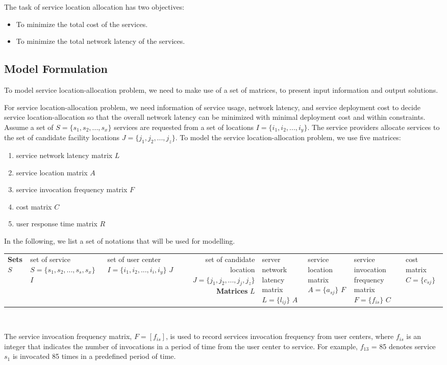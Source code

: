 \documentclass{llncs}
\begin{document}
The task of service location allocation has two objectives:
\begin{itemize}
	\item To minimize the total cost of the services.
	\item To minimize the total network latency of the services.
\end{itemize}


\subsection{Model Formulation}
To model service location-allocation problem, we need to make use of a set of matrices, to present input information and output solutions. 

For service location-allocation problem, we need information of service usage, network latency, and service deployment cost to decide service location-allocation so that the overall network latency can be minimized with minimal deployment cost and within constraints.
Assume a set of $S = \{ s_{1}, s_{2}, ..., s_{x}\}$ services are
requested from a set of locations $I = \{ i_{1}, i_{2}, ..., i_{y} \}$. 
The service providers allocate services to the set of candidate facility locations $J = \{ j_{1}, j_{2}, ..., j_{z} \}$.
To model the service location-allocation problem, we use five matrices: 
\begin{enumerate}
	\item service network latency matrix $L$
	\item service location matrix $A$
	\item service invocation frequency matrix $F$
	\item cost matrix $C$
	\item user response time matrix $R$
\end{enumerate}

In the following, we list a set of notations that will be used for modelling. 
{
\centering
	\begin{tabular}{l*{2}{l}r}
		\hline
		\textbf{Sets} \cr
		$S$	& set of service $S = \{s_{1}, s_{2}, ..., s_{s}, s_{x}\}$ \cr
		$I$	& set of user center $I = \{i_{1}, i_{2}, ..., i_{i}, i_{y}\}$ \cr
		$J$	& set of candidate location $J = \{j_{1}, j_{2}, ..., j_{j}, j_{z}\}$ \cr
		\textbf{Matrices} \cr
		$L$ & server network latency matrix $L = \{l_{ij}\}$ \cr
		$A$ & service location matrix $A = \{a_{sj}\}$ \cr
		$F$ & service invocation frequency matrix $F = \{f_{is}\}$ \cr
		$C$ & cost matrix $C = \{c_{sj}\}$ \cr
		\hline
	\end{tabular}
\\
}
The service invocation frequency matrix, $F= [f_{is}]$, is used to record services invocation frequency from user centers, 
where $f_{is}$ is an integer that indicates the number of invocations in a period of time from the user center to service. 
For example, $f_{13}$ = 85 denotes service $s_{1}$ is invocated 85 times in a predefined period of time.
\end{document}
